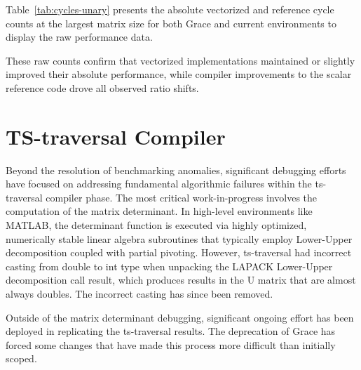 Table~\ref{tab:cycles-unary} presents the absolute vectorized and reference cycle counts at the largest matrix size for both Grace and current environments to display the raw performance data.



These raw counts confirm that vectorized implementations maintained or slightly improved their absolute performance, while compiler improvements to the scalar reference code drove all observed ratio shifts.

\section{TS-traversal Compiler}

Beyond the resolution of benchmarking anomalies, significant debugging efforts have focused on addressing fundamental algorithmic failures within the ts-traversal compiler phase. The most critical work-in-progress involves the computation of the matrix determinant. In high-level environments like MATLAB, the determinant function is executed via highly
optimized, numerically stable linear algebra subroutines that typically employ Lower-Upper decomposition coupled with partial pivoting. However, ts-traversal had incorrect casting from double to int type when unpacking the LAPACK Lower-Upper decomposition call result, which produces results in the U matrix that are almost always doubles. The incorrect casting has since been removed.

Outside of the matrix determinant debugging, significant ongoing effort has been deployed in replicating the ts-traversal results. The deprecation of Grace has forced some changes that have made this process more difficult than initially scoped.
